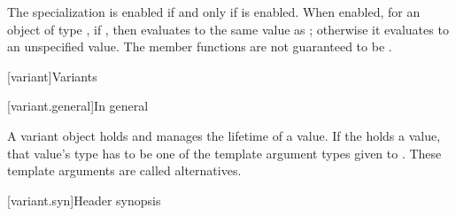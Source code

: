 \begin{itemdescr}
\pnum
The specialization  is enabled
if and only if  is enabled.
When enabled, for an object  of type ,
if , then 
evaluates to the same value as ;
otherwise it evaluates to an unspecified value.
The member functions are not guaranteed to be .
\end{itemdescr}


[variant]{Variants}

[variant.general]{In general}

\pnum
A variant object holds and manages the lifetime of a value.
If the  holds a value, that value's type has to be one
of the template argument types given to .
These template arguments are called alternatives.

[variant.syn]{Header  synopsis}
%

